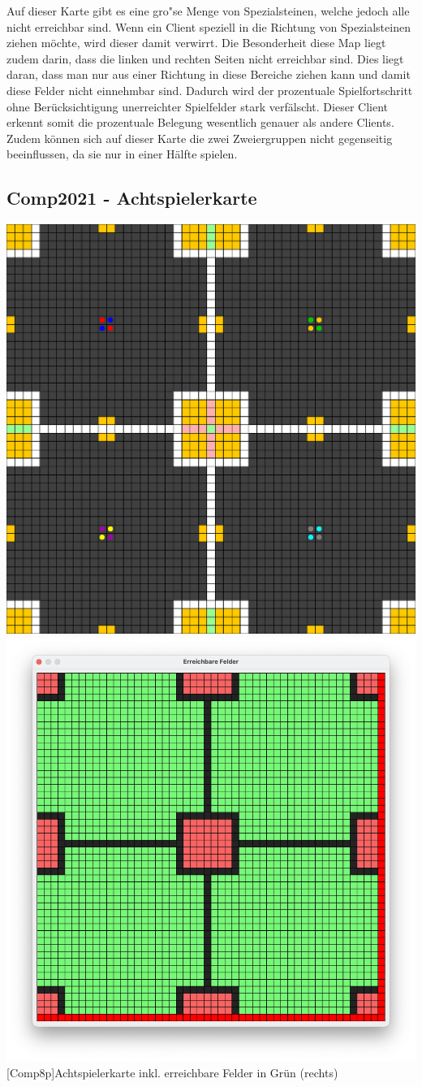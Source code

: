 Auf dieser Karte gibt es eine gro"se Menge von Spezialsteinen, welche jedoch alle nicht erreichbar sind.
Wenn ein Client speziell in die Richtung von Spezialsteinen ziehen m\"ochte, wird dieser damit verwirrt.
Die Besonderheit diese Map liegt zudem darin, dass die linken und rechten Seiten nicht erreichbar sind.
Dies liegt daran, dass man nur aus einer Richtung in diese Bereiche ziehen kann und damit diese Felder nicht einnehmbar sind.
Dadurch wird der prozentuale Spielfortschritt ohne Ber\"ucksichtigung unerreichter Spielfelder stark verf\"alscht.
Dieser Client erkennt somit die prozentuale Belegung wesentlich genauer als andere Clients.
Zudem k\"onnen sich auf dieser Karte die zwei Zweiergruppen nicht gegenseitig beeinflussen, da sie nur in einer H\"alfte spielen.

\subsection{Comp2021 - Achtspielerkarte}\label{subsec:comp2021-8p}

\vspace{1em}
\begin{minipage}{\linewidth}
    \centering
    \includegraphics[width=0.49\linewidth]{pics/maps/comp2021_01_8p}
    \includegraphics[width=0.48\linewidth]{pics/maps/field2021_01_8p}
    [Comp8p]{Achtspielerkarte inkl. erreichbare Felder in Gr\"un (rechts)}
    \label{fig:comp-8p}
\end{minipage}
\vspace{1em}

